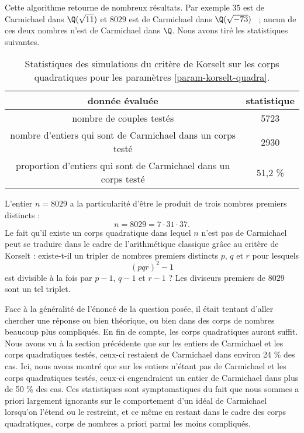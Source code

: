 Cette algorithme retourne de nombreux résultats. Par exemple $35$ est de Carmichael dans $\Q(\sqrt{11})$ et $8029$ est de Carmichael dans $\Q(\sqrt{-73})$ ~; aucun de ces deux nombres n'est de Carmichael dans $\Q$.  Nous avons tiré les statistiques suivantes.

\begin{table}[H]
	\begin{center}
		\begin{tabular}{|c|c|}
			\hline
			donnée évaluée & statistique \\
			\hline
			\hline
			nombre de couples testés & 5723 \\\hline
			nombre d'entiers qui sont de Carmichael dans un corps testé & 2930 \\\hline
			proportion d'entiers qui sont de Carmichael dans un corps testé & 51,2 \% \\\hline
		\end{tabular}
		\caption{Statistiques des simulations du critère de Korselt sur les corps quadratiques pour les paramètres \ref{param-korselt-quadra}.}
	\end{center}
\end{table}

\begin{remarque}
L'entier $n = 8029$ a la particularité d'être le produit de trois nombres premiers distincts : \[n = 8029 = 7 \cdot 31 \cdot 37.\] Le fait qu'il existe un corps quadratique dans lequel $n$ n'est pas de Carmichael peut se traduire dans le cadre de l'arithmétique classique grâce au critère de Korselt : existe-t-il un tripler de nombres premiers distincts $p$, $q$ et $r$ pour lesquels \[(pqr)^2 - 1\] est divisible à la fois par $p-1$, $q-1$ et $r-1$ ? Les diviseurs premiers de $8029$ sont un tel triplet.
\end{remarque}

Face à la généralité de l'énoncé de la question posée, il était tentant d'aller chercher une réponse ou bien théorique, ou bien dans des corps de nombres beaucoup plus compliqués. En fin de compte, les corps quadratiques auront suffit. Nous avons vu à la section précédente que sur les entiers de Carmichael et les corps quadratiques testés, ceux-ci restaient de Carmichael dans environ 24 \% des cas. Ici, nous avons montré que sur les entiers n'étant pas de Carmichael et les corps quadratiques testés, ceux-ci engendraient un entier de Carmichael dans plus de 50 \% des cas. Ces statistiques sont symptomatiques du fait que nous sommes a priori largement ignorants sur le comportement d'un idéal de Carmichael lorsqu'on l'étend ou le restreint, et ce même en restant dans le cadre des corps quadratiques, corps de nombres a priori parmi les moins compliqués.
